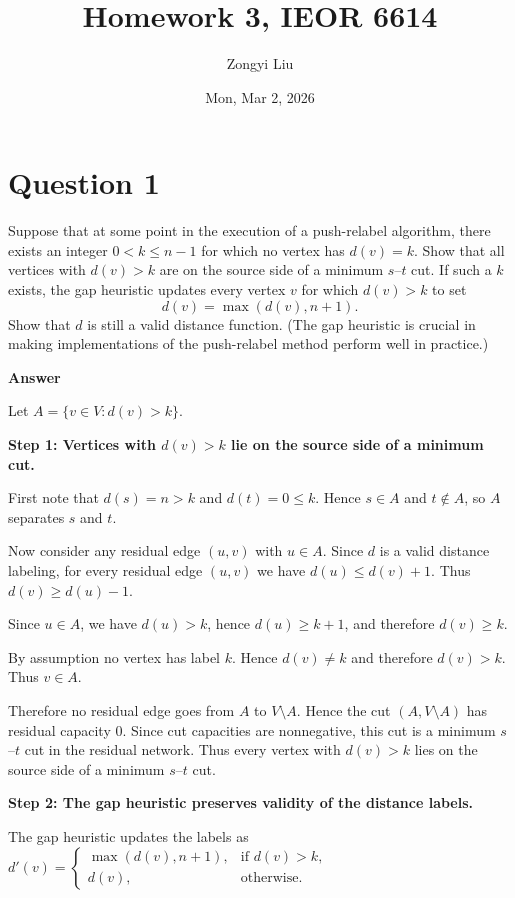 \documentclass[letterpaper]{article}
\title{Homework 3, IEOR 6614}
\author{Zongyi Liu}
\date{Mon, Mar 2, 2026}
\begin{document}
		\maketitle
		
		\section{Question 1}
		
		Suppose that at some point in the execution of a push-relabel algorithm, there exists an integer 
		$0 < k \le n - 1$ for which no vertex has $d(v) = k$. Show that all vertices with $d(v) > k$ are 
		on the source side of a minimum $s$--$t$ cut. If such a $k$ exists, the gap heuristic updates every 
		vertex $v$ for which $d(v) > k$ to set
		\[
		d(v) = \max(d(v), n + 1).
		\]
		Show that $d$ is still a valid distance function. (The gap heuristic is crucial in making 
		implementations of the push-relabel method perform well in practice.)
		
		\textbf{Answer}
		
		Let $A = \{v \in V : d(v) > k\}$.
		
		\textbf{Step 1: Vertices with $d(v) > k$ lie on the source side of a minimum cut.}
		
		First note that $d(s) = n > k$ and $d(t) = 0 \le k$. Hence
		$s \in A$ and $t \notin A$, so $A$ separates $s$ and $t$.
		
		Now consider any residual edge $(u,v)$ with $u \in A$. Since $d$ is a valid
		distance labeling, for every residual edge $(u,v)$ we have
		$d(u) \le d(v) + 1$. Thus
		$d(v) \ge d(u) - 1.$
		
		Since $u \in A$, we have $d(u) > k$, hence $d(u) \ge k+1$, and therefore
		$d(v) \ge k.$
		
		By assumption no vertex has label $k$. Hence $d(v) \ne k$ and therefore
		$d(v) > k$. Thus $v \in A$.
		
		Therefore no residual edge goes from $A$ to $V \setminus A$. Hence the cut
		$(A, V \setminus A)$ has residual capacity $0$. Since cut capacities are
		nonnegative, this cut is a minimum $s$--$t$ cut in the residual network.
		Thus every vertex with $d(v) > k$ lies on the source side of a minimum
		$s$--$t$ cut.
		
		\medskip
		
		\textbf{Step 2: The gap heuristic preserves validity of the distance labels.}
		
		The gap heuristic updates the labels as
		$
		d'(v) =
		\begin{cases}
			\max(d(v), n+1), & \text{if } d(v) > k, \\
			d(v), & \text{otherwise}.
		\end{cases}
		$
		
\end{document}
